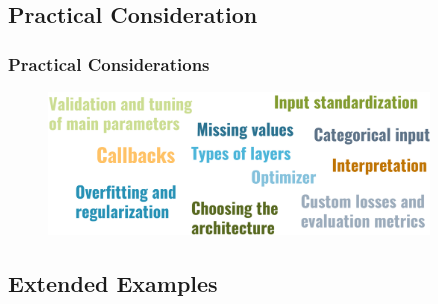 \subsection{Practical Consideration}

\begin{frame}
	\frametitle{Practical Considerations}
	\begin{figure}
		\includegraphics[width=0.9\textwidth]{pics/nn_practical.png}
	\end{figure}
\end{frame}

\subsection{Extended Examples}

